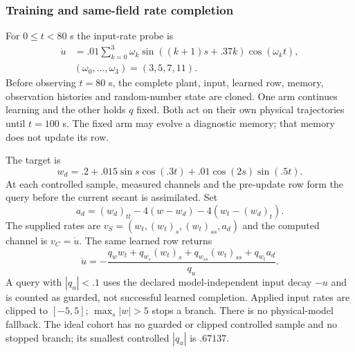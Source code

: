 \documentclass[journal]{IEEEtran}
\begin{document}
\subsubsection{Training and same-field rate completion}
For $0\leq t<80$ s the input-rate probe is
\begin{equation}
 \begin{aligned}
 \dot u&=.01\sum_{k=0}^{3}\omega_k
       \sin((k+1)s+.37k)\cos(\omega_kt),\\
 &(\omega_0,\ldots,\omega_3)=(3,5,7,11).
 \end{aligned}
 \label{eq:direct_burgers_probe}
\end{equation}
Before observing $t=80$ s, the complete plant, input, learned row, memory,
observation histories and random-number state are cloned. One arm continues
learning and the other holds $q$ fixed. Both act on their own physical
trajectories until $t=100$ s. The fixed arm may evolve a diagnostic memory;
that memory does not update its row.

The target is
\begin{equation}
 w_d=.2+.015\sin s\cos(.3t)+.01\cos(2s)\sin(.5t).
 \label{eq:direct_burgers_reference}
\end{equation}
At each controlled sample, measured channels and the pre-update row form the
query before the current secant is assimilated. Set
\begin{equation}
 a_d=(w_d)_{tt}-4(w-w_d)-4(w_t-(w_d)_t).
\end{equation}
The supplied rates are $v_S=(w_t,(w_t)_s,(w_t)_{ss},a_d)$ and the computed
channel is $v_C=\dot u$. The same learned row returns
\begin{equation}
 \dot u=-\frac{q_w w_t+q_{w_s}(w_t)_s+q_{w_{ss}}(w_t)_{ss}+q_{w_t}a_d}{q_u}.
 \label{eq:direct_burgers_completion}
\end{equation}
A query with $|q_u|<.1$ uses the declared model-independent input decay $-u$
and is counted as guarded, not successful learned completion. Applied input
rates are clipped to $[-5,5]$; $\max_s|w|>5$ stops a branch. There is no
physical-model fallback. The ideal cohort has no guarded or clipped controlled
sample and no stopped branch; its smallest controlled $|q_u|$ is $.67137$.
\end{document}
